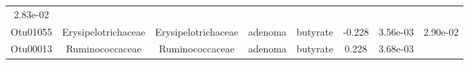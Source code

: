 \documentclass[11pt,]{article}
\begin{document}
\begin{longtable}[]{@{}cccccccc@{}}
\begin{minipage}[t]{0.08\columnwidth}
2.83e-02\strut
\end{minipage}\tabularnewline
\begin{minipage}[t]{0.08\columnwidth}\centering\strut
Otu01055\strut
\end{minipage} & \begin{minipage}[t]{0.15\columnwidth}\centering\strut
Erysipelotrichaceae\strut
\end{minipage} & \begin{minipage}[t]{0.15\columnwidth}\centering\strut
Erysipelotrichaceae\strut
\end{minipage} & \begin{minipage}[t]{0.08\columnwidth}\centering\strut
adenoma\strut
\end{minipage} & \begin{minipage}[t]{0.09\columnwidth}\centering\strut
butyrate\strut
\end{minipage} & \begin{minipage}[t]{0.07\columnwidth}\centering\strut
-0.228\strut
\end{minipage} & \begin{minipage}[t]{0.08\columnwidth}\centering\strut
3.56e-03\strut
\end{minipage} & \begin{minipage}[t]{0.08\columnwidth}\centering\strut
2.90e-02\strut
\end{minipage}\tabularnewline
\begin{minipage}[t]{0.08\columnwidth}\centering\strut
Otu00013\strut
\end{minipage} & \begin{minipage}[t]{0.15\columnwidth}\centering\strut
Ruminococcaceae\strut
\end{minipage} & \begin{minipage}[t]{0.15\columnwidth}\centering\strut
Ruminococcaceae\strut
\end{minipage} & \begin{minipage}[t]{0.08\columnwidth}\centering\strut
adenoma\strut
\end{minipage} & \begin{minipage}[t]{0.09\columnwidth}\centering\strut
butyrate\strut
\end{minipage} & \begin{minipage}[t]{0.07\columnwidth}\centering\strut
0.228\strut
\end{minipage} & \begin{minipage}[t]{0.08\columnwidth}\centering\strut
3.68e-03\strut
\end{minipage} & \begin{minipage}[t]{0.08\columnwidth}\centering\strut

\end{minipage}
\end{longtable}
\end{document}
